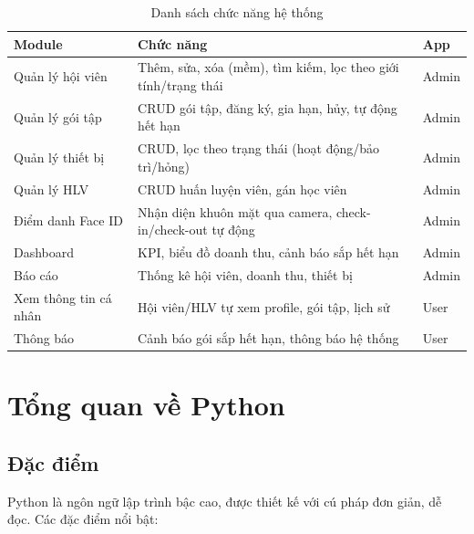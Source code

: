 \documentclass[12pt,a4paper]{article}
\begin{document}
\begin{table}[H]
	\centering
	\caption{Danh sách chức năng hệ thống}
	\begin{tabularx}{\textwidth}{|l|X|l|}
		\hline
		\textbf{Module}       & \textbf{Chức năng}                                            & \textbf{App} \\
		\hline
		Quản lý hội viên      & Thêm, sửa, xóa (mềm), tìm kiếm, lọc theo giới tính/trạng thái & Admin        \\
		\hline
		Quản lý gói tập       & CRUD gói tập, đăng ký, gia hạn, hủy, tự động hết hạn          & Admin        \\
		\hline
		Quản lý thiết bị      & CRUD, lọc theo trạng thái (hoạt động/bảo trì/hỏng)            & Admin        \\
		\hline
		Quản lý HLV           & CRUD huấn luyện viên, gán học viên                            & Admin        \\
		\hline
		Điểm danh Face ID     & Nhận diện khuôn mặt qua camera, check-in/check-out tự động    & Admin        \\
		\hline
		Dashboard             & KPI, biểu đồ doanh thu, cảnh báo sắp hết hạn                  & Admin        \\
		\hline
		Báo cáo               & Thống kê hội viên, doanh thu, thiết bị                        & Admin        \\
		\hline
		Xem thông tin cá nhân & Hội viên/HLV tự xem profile, gói tập, lịch sử                 & User         \\
		\hline
		Thông báo             & Cảnh báo gói sắp hết hạn, thông báo hệ thống                  & User         \\
		\hline
	\end{tabularx}
\end{table}

\section{Tổng quan về Python}

\subsection{Đặc điểm}

Python là ngôn ngữ lập trình bậc cao, được thiết kế với cú pháp đơn giản, dễ đọc. Các đặc điểm nổi bật:
\end{document}
